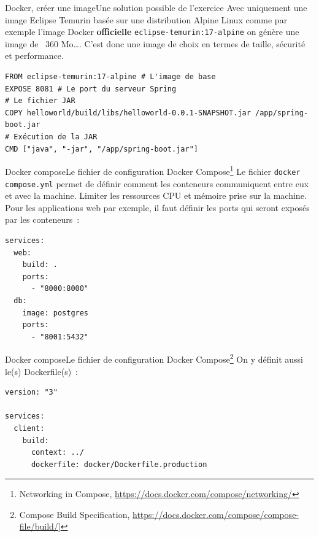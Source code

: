 \documentclass{beamer}
\begin{document}
    \begin{frame}[fragile]{Docker, créer une image}{Une solution possible de l'exercice}
        Avec uniquement une image Eclipse Temurin basée sur une distribution Alpine Linux comme par exemple l'image Docker \textbf{officielle} \lstinline{eclipse-temurin:17-alpine} on génère une image de  ~360 Mo\ldots.
        \bigbreak
        \bigbreak
        C'est donc une image de choix en termes de taille, sécurité et performance.
        \begin{lstlisting}
FROM eclipse-temurin:17-alpine # L'image de base
EXPOSE 8081 # Le port du serveur Spring
# Le fichier JAR
COPY helloworld/build/libs/helloworld-0.0.1-SNAPSHOT.jar /app/spring-boot.jar
# Exécution de la JAR
CMD ["java", "-jar", "/app/spring-boot.jar"]
        \end{lstlisting}
    \end{frame}

    \begin{frame}[fragile]{Docker compose}{Le fichier de configuration Docker Compose\footnote{Networking in Compose, \url{https://docs.docker.com/compose/networking/}}}
        Le fichier \lstinline{docker compose.yml} permet de définir comment les conteneurs communiquent entre eux et avec la machine.
        Limiter les ressources CPU et mémoire prise sur la machine.
        \bigbreak
        Pour les applications web par exemple, il faut définir les ports qui seront exposés par les conteneurs~:
        \begin{lstlisting}
services:
  web:
    build: .
    ports:
      - "8000:8000"
  db:
    image: postgres
    ports:
      - "8001:5432"
        \end{lstlisting}
    \end{frame}

    \begin{frame}[fragile]{Docker compose}{Le fichier de configuration Docker Compose\footnote{Compose Build Specification, \url{https://docs.docker.com/compose/compose-file/build/}]}}
        On y définit aussi le(s) Dockerfile(s)~:
        \begin{lstlisting}
version: "3"

services:
  client:
    build:
      context: ../
      dockerfile: docker/Dockerfile.production
        \end{lstlisting}
    \end{frame}
\end{document}
